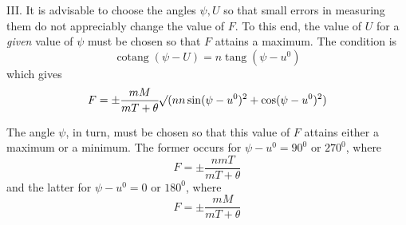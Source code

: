 III. It is advisable to choose the angles $\psi,U$ so that small errors in measuring them do not appreciably change the value of $F$. To this end, the value of $U$ for a \textit{given} value of $\psi$ must be chosen so that $F$ attains a maximum. The condition is
\[
\operatorname{cotang}(\psi-U)=n\operatorname{tang}(\psi-u^0)
\]
which gives
\[
F=\pm\frac{mM}{mT+\theta}\mathord{{}^{}\!\surd}(nn\sin(\psi-u^0)^2+\cos(\psi-u^0)^2)
\]

The angle $\psi$, in turn, must be chosen so that this value of $F$ attains either a maximum or a minimum. The former occurs for $\psi-u^0=90^0$ or $270^0$, where
\[
F=\pm\frac{nmT}{mT+\theta}
\]
and the latter for $\psi-u^0=0$ or $180^0$, where
\[
F=\pm\frac{mM}{mT+\theta}
\]

